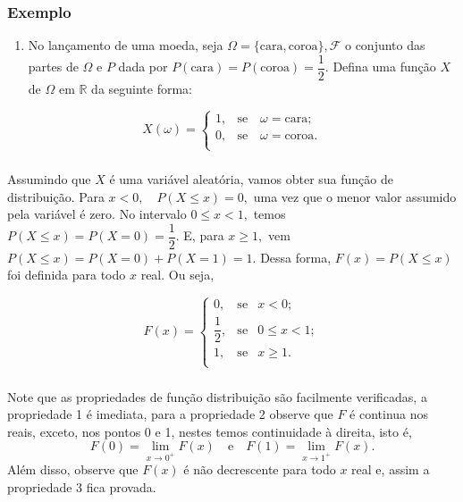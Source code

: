 \documentclass[14pt,aspectratio=1610]{beamer}
\begin{document}
\begin{frame}{}
\frametitle{Exemplo}
\begin{block}{}
\justifying

\begin{enumerate}
\item No lançamento de uma moeda, seja $\Omega=\{\textrm{cara}, \textrm{coroa}\}, \mathcal{F}$ o conjunto das partes de $\Omega$ e $P$ dada por $P(\textrm{cara})=P(\textrm{coroa})=\dfrac{1}{2}.$ Defina uma função $X$ de $\Omega$ em $\mathbb{R}$ da seguinte forma:
\end{enumerate}


$$
X(\omega)=\left\{
\begin{array}{ccc}
1,& \textrm{se}\quad \omega=\textrm{cara};\\
0,& \textrm{se}\quad \omega=\textrm{coroa}.\\
\end{array}
\right.
$$

\end{block}
\end{frame}

\begin{frame}{}
\frametitle{}
\begin{block}{}
\justifying
Assumindo que $X$ é uma variável aleatória, vamos obter sua função de distribuição.
Para $x<0, \quad P(X\leq x)=0,$ uma vez que o menor valor assumido pela variável é zero. No intervalo $0\leq x <1,$ temos $P(X\leq x)=P(X=0)=\dfrac{1}{2}.$ E, para 
$x\geq 1,$ vem $P(X\leq x)=P(X=0)+P(X=1)=1.$ Dessa forma, $F(x)=P(X\leq x)$ foi definida para todo $x$ real. Ou seja,

$$
F(x)=\left\{
\begin{array}{ccccc}
0,           & \textrm{se} & x<0     ;\\
\dfrac{1}{2},& \textrm{se} & 0\leq x<1;\\
1,           & \textrm{se} & x\geq 1 .\\
\end{array}
\right.
$$
\end{block}
\end{frame}

\begin{frame}{}
\frametitle{}
\begin{block}{}
\justifying
Note que as propriedades de função distribuição são facilmente verificadas, a propriedade 1 é imediata, para a propriedade 2 observe que $F$ é continua nos reais, 
exceto, nos pontos 0 e 1, nestes temos continuidade à direita, isto é, 
$${\displaystyle F(0)= \lim_{x \to 0^{+}}F(x)\quad \textrm{e}\quad 
                 F(1)= \lim_{x \to 1^{+}}F(x)}.$$ 
Além disso, observe que $F(x)$ é não decrescente para todo $x$ real e, assim a propriedade 3 fica provada.
\end{block}
\end{frame}
\end{document}
